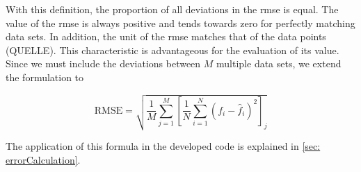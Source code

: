With this definition, the proportion of all deviations in the \acrshort{rmse} is equal. The value of the \acrshort{rmse} is always positive and tends towards zero for perfectly matching data sets. In addition, the unit of the \acrshort{rmse} matches that of the data points (QUELLE). This characteristic is advantageous for the evaluation of its value. Since we must include the deviations between $M$ multiple data sets, we extend the formulation to 

\begin{equation} \label{eq: multiRMSE}
    \text{RMSE} = \sqrt{\frac{1}{M} \sum_{j=1}^{M} \left[ \frac{1}{N} \sum_{i=1}^{N} (f_i - \hat{f}_i)^2 \right] _j}
\end{equation}

The application of this formula in the developed code is explained in \autoref{sec: errorCalculation}.













